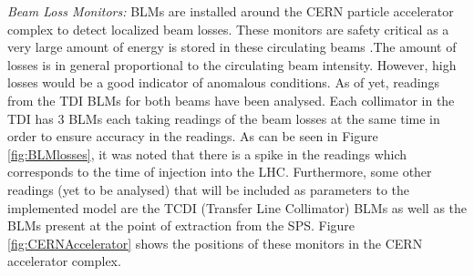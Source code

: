 \documentclass[12pt, twoside]{report}
\begin{document}
	\par \textit{Beam Loss Monitors:} BLMs are installed around the CERN particle accelerator complex to detect localized beam losses. These monitors are safety critical as a very large amount of energy is stored in these circulating beams \cite{r:BLMs}.The amount of losses is in general proportional to the circulating beam intensity. However, high losses would be a good indicator of anomalous conditions. As of yet, readings from the TDI BLMs for both beams have been analysed. Each collimator in the TDI has 3 BLMs each taking readings of the beam losses at the same time in order to ensure accuracy in the readings. As can be seen in Figure \ref{fig:BLMlosses}, it was noted that there is a spike in the readings which corresponds to the time of injection into the LHC. Furthermore, some other readings (yet to be analysed) that will be included as parameters to the implemented model are the TCDI (Transfer Line Collimator) BLMs as well as the BLMs present at the point of extraction from the SPS. Figure \ref{fig:CERNAccelerator} shows the positions of these monitors in the CERN accelerator complex.
	
\end{document}

